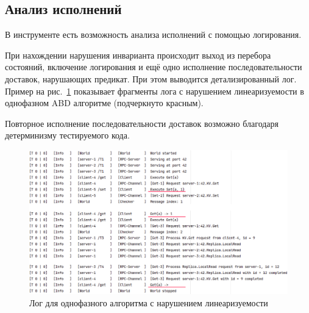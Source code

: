 \subsection{Анализ исполнений}

В инструменте есть возможность анализа исполнений с помощью логирования. 

При нахождении нарушения инварианта происходит выход из перебора состояний, включение логирования и ещё одно исполнение последовательности доставок, нарушающих предикат. При этом выводится детализированный лог. Пример на рис.~\ref{fig:log} показывает фрагменты лога с нарушением линеаризуемости в однофазном ABD алгоритме (подчеркнуто красным).

Повторное исполнение последовательности доставок возможно благодаря детерминизму тестируемого кода.

\begin{figure}[h]
    \centering
    \includegraphics[width=\textwidth]{img/log.png}
    \caption{Лог для однофазного алгоритма с нарушением линеаризуемости}
    \label{fig:log}
\end{figure}
